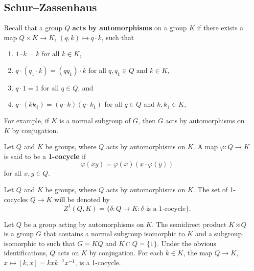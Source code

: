 \section{}

\subsection{Schur--Zassenhaus}


Recall that a group $Q$ \textbf{acts by automorphisms} on a group $K$ if 
there exists a map $Q\times K\to K$, $(q,k)\mapsto q\cdot k$, 
such that 
\begin{enumerate}
    \item $1\cdot k=k$ for all $k\in K$, 
    \item $q\cdot (q_1\cdot k)=(qq_1)\cdot k$ for all $q,q_1\in Q$ and $k\in K$, 
    \item $q\cdot 1=1$ for all $q\in Q$, and 
    \item $q\cdot (kk_1)=(q\cdot k)(q\cdot k_1)$ for all $q\in Q$ and $k,k_1\in K$, 
\end{enumerate}
For example, if $K$ is a normal subgroup of $G$, 
then $G$ acts by automorphisms on $K$ by conjugation. 

\begin{definition}
Let $Q$ and $K$ be groups, where $Q$ acts by automorphisms on $K$. 
A map 
$\varphi\colon Q\to K$ is said to be a \textbf{1-cocycle} if 
\[
	\varphi(xy)=\varphi(x)(x\cdot\varphi(y))
\]
for all $x,y\in Q$.  
\end{definition}

Let $Q$ and $K$ be groups, where $Q$ acts by automorphisms on $K$. 
The set of 1-cocycles $Q\to K$ will be denoted by 
\[
Z^1(Q,K)=\{\delta\colon Q\to K:\text{$\delta$ is a 1-cocycle}\}.
\]

\begin{example}
Let $Q$ be a group acting by automorphisms on $K$. 
The semidirect product $K\rtimes Q$ 
is a group $G$ that contains a normal subgroup isomorphic to $K$ 
and a subgroup isomorphic to such that 
$G=KQ$ and $K\cap Q=\{1\}$. Under the obvious identifications, 
$Q$ acts on $K$ by conjugation. For each $k\in K$, the map 
$Q\to K$, $x\mapsto [k,x]=kxk^{-1}x^{-1}$, is a 1-cocycle. 
\end{example}


